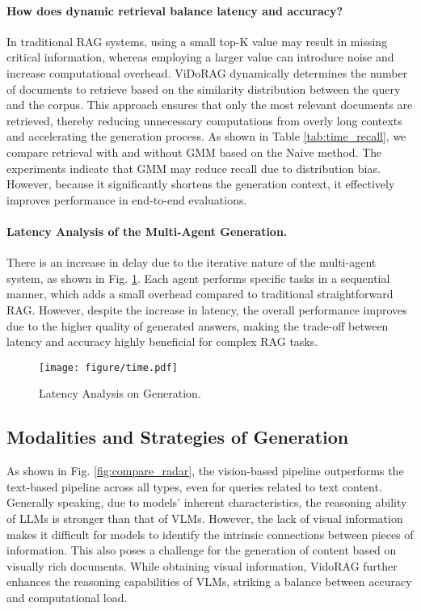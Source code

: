 \paragraph{How does dynamic retrieval balance latency and accuracy?}
In traditional RAG systems, using a small top-K value may result in missing critical information, whereas employing a larger value can introduce noise and increase computational overhead. ViDoRAG dynamically determines the number of documents to retrieve based on the similarity distribution between the query and the corpus. This approach ensures that only the most relevant documents are retrieved, thereby reducing unnecessary computations from overly long contexts and accelerating the generation process. As shown in Table \ref{tab:time_recall}, we compare retrieval with and without GMM based on the Naive method. The experiments indicate that GMM may reduce recall due to distribution bias. However, because it significantly shortens the generation context, it effectively improves performance in end-to-end evaluations.


\paragraph{Latency Analysis of the Multi-Agent Generation.}
There is an increase in delay due to the iterative nature of the multi-agent system, as shown in Fig. \ref{fig:gen_time}. Each agent performs specific tasks in a sequential manner, which adds a small overhead compared to traditional straightforward RAG. However, despite the increase in latency, the overall performance improves due to the higher quality of generated answers, making the trade-off between latency and accuracy highly beneficial for complex RAG tasks.

\begin{figure}[!h]
    \centering 
    \texttt{[image: figure/time.pdf]}
    \caption{Latency Analysis on Generation.}
    \label{fig:gen_time}
\end{figure}

\subsection{Modalities and Strategies of Generation}
As shown in Fig. \ref{fig:compare_radar}, the vision-based pipeline outperforms the text-based pipeline across all types, even for queries related to text content. Generally speaking, due to models' inherent characteristics, the reasoning ability of LLMs is stronger than that of VLMs. However, the lack of visual information makes it difficult for models to identify the intrinsic connections between pieces of information. This also poses a challenge for the generation of content based on visually rich documents. While obtaining visual information, VidoRAG further enhances the reasoning capabilities of VLMs, striking a balance between accuracy and computational load.

